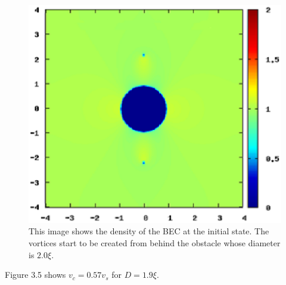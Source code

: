\documentclass[12pt,a4paper]{report} %
\begin{document}
\begin{figure}[htbp]\begin{center}
\includegraphics[scale=0.6,keepaspectratio]{3-5.eps}
\caption{
This image shows the density of the BEC at the initial state.
The vortices start to be created from behind the obstacle whose diameter is $2.0\xi$.
}
\label{FIG:3-5}
\end{center}\end{figure}
Figure 3.5 shows $v_c = 0.57v_s$ for $D = 1.9\xi$.

\newpage
\end{document}
